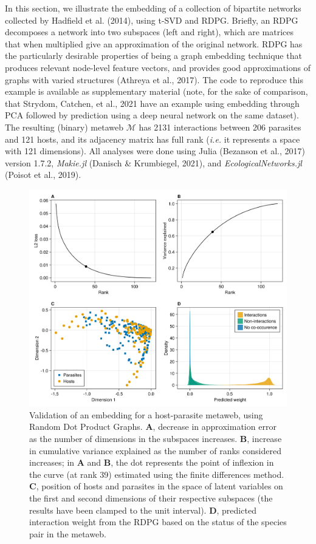 \documentclass[10pt,oneside]{article}
\makeatletter
\def\maxwidth{\ifdim\Gin@nat@width>\linewidth\linewidth
\else\Gin@nat@width\fi}
\let\Oldincludegraphics\includegraphics
\renewcommand{\includegraphics}[1]{\Oldincludegraphics[width=\maxwidth]{#1}}
\makeatother
\begin{document}
In this section, we illustrate the embedding of a collection of
bipartite networks collected by Hadfield et al. (2014), using t-SVD and
RDPG. Briefly, an RDPG decomposes a network into two subspaces (left and
right), which are matrices that when multiplied give an approximation of
the original network. RDPG has the particularly desirable properties of
being a graph embedding technique that produces relevant node-level
feature vectors, and provides good approximations of graphs with varied
structures (Athreya et al., 2017). The code to reproduce this example is
available as supplementary material (note, for the sake of comparison,
that Strydom, Catchen, et al., 2021 have an example using embedding
through PCA followed by prediction using a deep neural network on the
same dataset). The resulting (binary) metaweb \(\mathcal{M}\) has 2131
interactions between 206 parasites and 121 hosts, and its adjacency
matrix has full rank (\emph{i.e.} it represents a space with 121
dimensions). All analyses were done using Julia (Bezanson et al., 2017)
version 1.7.2, \emph{Makie.jl} (Danisch \& Krumbiegel, 2021), and
\emph{EcologicalNetworks.jl} (Poisot et al., 2019).

\begin{figure}
\hypertarget{fig:illustration1}{%
\centering
\includegraphics{figures/illustration-part1.png}
\caption{Validation of an embedding for a host-parasite metaweb, using
Random Dot Product Graphs. \textbf{A}, decrease in approximation error
as the number of dimensions in the subspaces increases. \textbf{B},
increase in cumulative variance explained as the number of ranks
considered increases; in \textbf{A} and \textbf{B}, the dot represents
the point of inflexion in the curve (at rank 39) estimated using the
finite differences method. \textbf{C}, position of hosts and parasites
in the space of latent variables on the first and second dimensions of
their respective subspaces (the results have been clamped to the unit
interval). \textbf{D}, predicted interaction weight from the RDPG based
on the status of the species pair in the
metaweb.}\label{fig:illustration1}
}
\end{figure}
\end{document}
